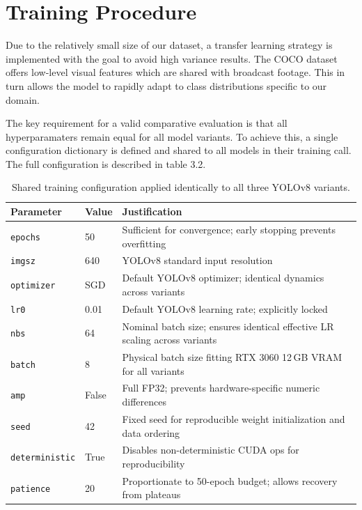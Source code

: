 \section{Training Procedure}

Due to the relatively small size of our dataset, a transfer learning strategy is implemented with the goal to avoid high variance results. The COCO dataset offers low-level visual features which are shared with broadcast footage. This in turn allows the model to rapidly adapt to class distributions specific to our domain. 

The key requirement for a valid comparative evaluation is that all hyperparamaters remain equal for all model variants. To achieve this, a single configuration dictionary is defined and shared to all models in their training call. The full configuration is described in table 3.2.

\begin{table}[h]
\centering

\label{tab:training_config}
\begin{tabular}{lp{2cm}p{7cm}}
\hline
\textbf{Parameter} & \textbf{Value} & \textbf{Justification} \\
\hline
\texttt{epochs}        & 50      & Sufficient for convergence; early stopping prevents overfitting \\ \hline
\texttt{imgsz}         & 640     & YOLOv8 standard input resolution \\ \hline
\texttt{optimizer}     & SGD     & Default YOLOv8 optimizer; identical dynamics across variants \\ \hline
\texttt{lr0}           & 0.01    & Default YOLOv8 learning rate; explicitly locked \\ \hline
\texttt{nbs}           & 64      & Nominal batch size; ensures identical effective LR scaling across variants \\ \hline
\texttt{batch}         & 8       & Physical batch size fitting RTX 3060 12\,GB VRAM for all variants \\ \hline
\texttt{amp}           & False   & Full FP32; prevents hardware-specific numeric differences \\ \hline
\texttt{seed}          & 42      & Fixed seed for reproducible weight initialization and data ordering \\ \hline
\texttt{deterministic} & True    & Disables non-deterministic CUDA ops for reproducibility \\ \hline
\texttt{patience}      & 20      & Proportionate to 50-epoch budget; allows recovery from plateaus \\ \hline
\end{tabular}
\caption{Shared training configuration applied identically to all three YOLOv8 variants.}
\end{table}

